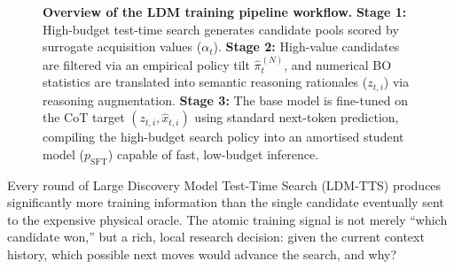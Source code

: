 \begin{figure}[t]
{%
}
\endgroup
\caption{\textbf{Overview of the LDM training pipeline workflow.}
\textbf{Stage 1:} High-budget test-time search generates candidate pools scored by surrogate acquisition values ($\alpha_t$). 
\textbf{Stage 2:} High-value candidates are filtered via an empirical policy tilt $\widehat{\pi}_t^{(N)}$, and numerical BO statistics are translated into semantic reasoning rationales ($z_{t,i}$) via reasoning augmentation. 
\textbf{Stage 3:} The base model is fine-tuned on the CoT target $(z_{t,i}, \hat{x}_{t,i})$ using standard next-token prediction, compiling the high-budget search policy into an amortised student model ($p_{\text{SFT}}$) capable of fast, low-budget inference.}
\label{fig:training-pipeline}
\end{figure}



Every round of Large Discovery Model Test-Time Search (LDM-TTS) produces significantly more training information than the single candidate eventually sent to the expensive physical oracle. The atomic training signal is not merely ``which candidate won,'' but a rich, local research decision: given the current context history, which possible next moves would advance the search, and why? 

